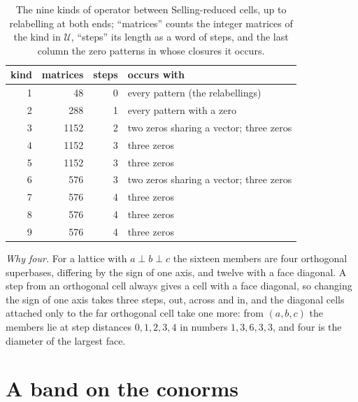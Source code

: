 \documentclass[preprint,pdf]{iucr}          %
\begin{document}
\begin{table}
\caption{The nine kinds of operator between Selling-reduced cells, up to relabelling at both ends; ``matrices'' counts the integer matrices of the kind in $\mathcal U$, ``steps'' its length as a word of steps, and the last column the zero patterns in whose closures it occurs.}
\label{tab:kinds}
\begin{footnotesize}
\begin{tabular}{rrrl}
\toprule
kind & matrices & steps & occurs with \\
\midrule
1 & 48 & 0 & every pattern (the relabellings) \\
2 & 288 & 1 & every pattern with a zero \\
3 & 1152 & 2 & two zeros sharing a vector; three zeros \\
4 & 1152 & 3 & three zeros \\
5 & 1152 & 3 & three zeros \\
6 & 576 & 3 & two zeros sharing a vector; three zeros \\
7 & 576 & 4 & three zeros \\
8 & 576 & 4 & three zeros \\
9 & 576 & 4 & three zeros \\
\bottomrule
\end{tabular}
\end{footnotesize}
\end{table}

\emph{Why four.} For a lattice with $a\perp b\perp c$ the sixteen members are four orthogonal superbases, differing by the sign of one axis, and twelve with a face diagonal. A step from an orthogonal cell always gives a cell with a face diagonal, so changing the sign of one axis takes three steps, out, across and in, and the diagonal cells attached only to the far orthogonal cell take one more: from $(a,b,c)$ the members lie at step distances $0,1,2,3,4$ in numbers $1,3,6,3,3$, and four is the diameter of the largest face.

\section{A band on the conorms}\label{app:tau}
\end{document}
